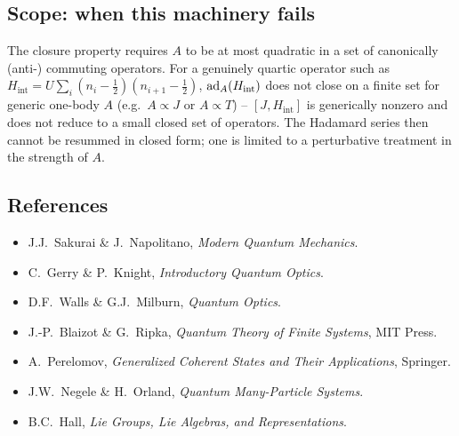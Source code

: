 \documentclass[../main.tex]{subfiles}
\begin{document}
\subsection{Scope: when this machinery fails}
The closure property requires $A$ to be at most quadratic in a set of canonically
(anti-) commuting operators. For a genuinely quartic operator such as
$H_{\mathrm{int}}=U\sum_i(n_i-\tfrac12)(n_{i+1}-\tfrac12)$, $\mathrm{ad}_A(H_{\mathrm{int}})$
does not close on a finite set for generic one-body $A$ (e.g.\ $A\propto J$ or
$A\propto T$) -- $[J,H_{\mathrm{int}}]$ is generically nonzero and does not reduce to a
small closed set of operators. The Hadamard series then cannot be resummed in closed
form; one is limited to a perturbative treatment in the strength of $A$.

\subsection{References}
\begin{itemize}
\item J.J.\ Sakurai \& J.\ Napolitano, \emph{Modern Quantum Mechanics}.
\item C.\ Gerry \& P.\ Knight, \emph{Introductory Quantum Optics}.
\item D.F.\ Walls \& G.J.\ Milburn, \emph{Quantum Optics}.
\item J.-P.\ Blaizot \& G.\ Ripka, \emph{Quantum Theory of Finite Systems}, MIT Press.
\item A.\ Perelomov, \emph{Generalized Coherent States and Their Applications}, Springer.
\item J.W.\ Negele \& H.\ Orland, \emph{Quantum Many-Particle Systems}.
\item B.C.\ Hall, \emph{Lie Groups, Lie Algebras, and Representations}.
\end{itemize}
\end{document}
